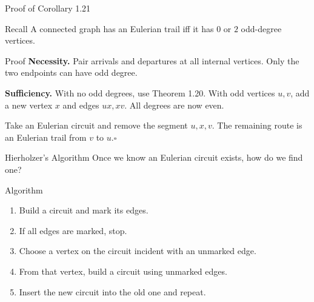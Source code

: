 \documentclass[aspectratio=169,11pt]{beamer}
\begin{document}
\begin{frame}{Proof of Corollary 1.21}
\large
\begin{block}{Recall}
A connected graph has an Eulerian trail iff it has $0$ or $2$ odd-degree vertices.
\end{block}
\begin{block}{Proof}
\normalsize \textbf{Necessity.} Pair arrivals and departures at all internal vertices. Only the two endpoints can have odd degree.\par\medskip\textbf{Sufficiency.} With no odd degrees, use Theorem 1.20. With odd vertices $u,v$, add a new vertex $x$ and edges $ux,xv$. All degrees are now even.\par\medskip Take an Eulerian circuit and remove the segment $u,x,v$. The remaining route is an Eulerian trail from $v$ to $u$.\hfill$\square$
\end{block}

\end{frame}

\begin{frame}{Hierholzer's Algorithm}
\large
Once we know an Eulerian circuit exists, how do we find one?\begin{block}{Algorithm}
\begin{enumerate}\item Build a circuit and mark its edges.\item If all edges are marked, stop.\item Choose a vertex on the circuit incident with an unmarked edge.\item From that vertex, build a circuit using unmarked edges.\item Insert the new circuit into the old one and repeat.\end{enumerate}
\end{block}

\end{frame}
\end{document}
